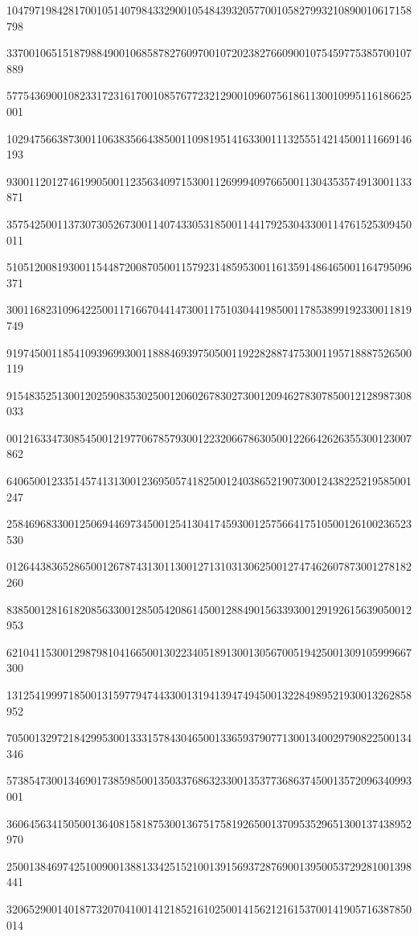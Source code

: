 \documentclass[10pt]{article}
\begin{document}
104797198428170010514079843329001054843932057700105827993210890010617158798\par
337001065151879884900106858782760970010720238276609001075459775385700107889\par
577543690010823317231617001085767723212900109607561861130010995116186625001\par
102947566387300110638356643850011098195141633001113255514214500111669146193\par
930011201274619905001123563409715300112699940976650011304353574913001133871\par
357542500113730730526730011407433053185001144179253043300114761525309450011\par
510512008193001154487200870500115792314859530011613591486465001164795096371\par
300116823109642250011716670441473001175103044198500117853899192330011819749\par
919745001185410939699300118884693975050011922828874753001195718887526500119\par
915483525130012025908353025001206026783027300120946278307850012128987308033\par
001216334730854500121977067857930012232066786305001226642626355300123007862\par
640650012335145741313001236950574182500124038652190730012438225219585001247\par
258469683300125069446973450012541304174593001257566417510500126100236523530\par
012644383652865001267874313011300127131031306250012747462607873001278182260\par
838500128161820856330012850542086145001288490156339300129192615639050012953\par
621041153001298798104166500130223405189130013056700519425001309105999667300\par
131254199971850013159779474433001319413947494500132284989521930013262858952\par
705001329721842995300133315784304650013365937907713001340029790822500134346\par
573854730013469017385985001350337686323300135377368637450013572096340993001\par
360645634150500136408158187530013675175819265001370953529651300137438952970\par
250013846974251009001388133425152100139156937287690013950053729281001398441\par
320652900140187732070410014121852161025001415621216153700141905716387850014\par
\end{document}
